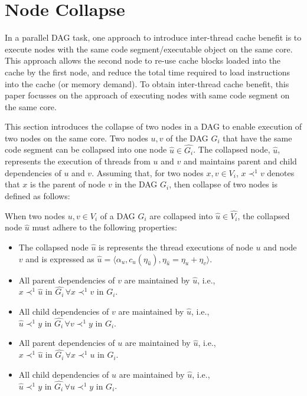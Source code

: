 \section{Node Collapse}
In a parallel DAG task, one approach to introduce inter-thread cache benefit is to execute nodes with the same code segment/executable object on the same core. This approach allows the second node to re-use cache blocks loaded into the cache by the first node, and reduce the total time required to load instructions into the cache (or memory demand). To obtain inter-thread cache benefit, this paper focusses on the approach of executing nodes with same code segment on the same core. 

This section introduces the collapse of two nodes in a DAG to enable execution of two nodes on the same core. Two nodes $u, v$ of the DAG $G_i$ that have the same code segment can be collapsed into one node $\hat{u} \in \hat{G_i}$. The collapsed node, $\hat{u}$, represents the execution of threads from $u$ and $v$ and maintains parent and child dependencies of $u$ and $v$. Assuming that, for two nodes $x, v \in V_i$, $x \prec^{1} v$ denotes that $x$ is the parent of node $v$ in the DAG $G_i$, then collapse of two nodes is defined as follows:
 \begin{definition}
When two nodes $u,v \in V_i$ of a DAG $G_i$ are collapsed into $\hat{u} \in \hat{V_i}$, the collapsed node $\hat{u}$ must adhere to the following properties:
\begin{itemize}
\item The collapsed node $\hat{u}$ is represents the thread executions of node $u$ and node $v$ and is expressed as $\hat{u} = \langle \alpha_u , c_u(\eta_{\hat{u}}), \eta_{\hat{u}} = \eta_u+\eta_v \rangle$.
\item All parent dependencies of $v$ are maintained by $\hat{u}$, i.e., $ x \prec^{1} \hat{u} \text{ in } \hat{G_i} \, \forall x \prec^1 v \text{ in } G_i$.
\item All child dependencies of $v$ are maintained by $\hat{u}$, i.e., $\hat{u} \prec^{1} y \text{ in } \hat{G_i} \, \forall v \prec^1 y \text{ in } G_i$.
\item All parent dependencies of $u$ are maintained by $\hat{u}$, i.e., $ x \prec^{1} \hat{u} \text{ in } \hat{G_i} \, \forall x \prec^1 u \text{ in } G_i$.
\item All child dependencies of $u$ are maintained by $\hat{u}$, i.e., $\hat{u} \prec^{1} y \text{ in } \hat{G_i} \, \forall u \prec^1 y \text{ in } G_i$.
\end{itemize}
 \end{definition}

